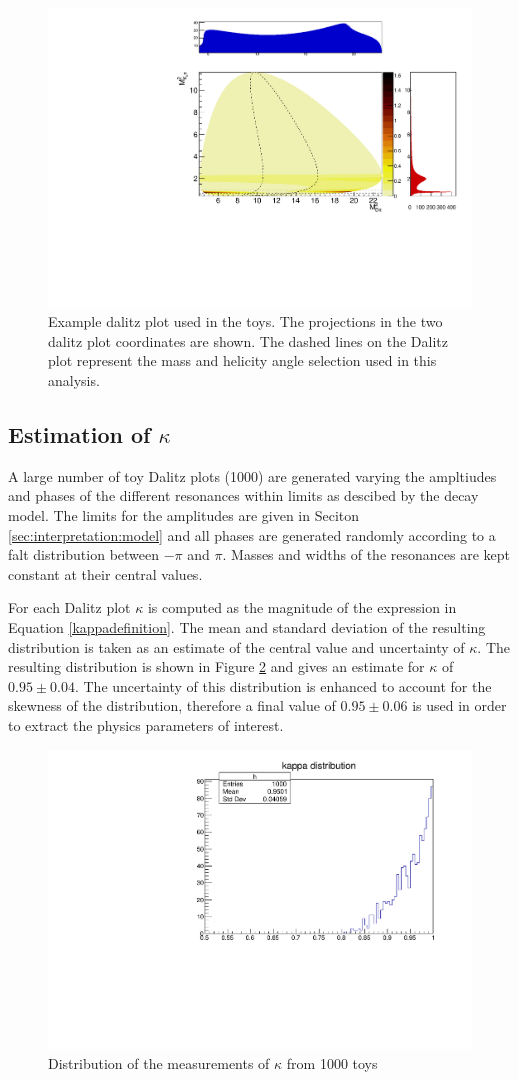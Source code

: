 \begin{figure}[h]
\centering
\includegraphics[width=0.8\linewidth]{figures/results/dalitz.pdf}
\caption{Example dalitz plot used in the toys. The projections in the two dalitz plot coordinates are shown. The dashed lines on the Dalitz plot represent the \Kstar mass and \KS helicity angle selection used in this analysis.}
\label{dalitzplot}
\end{figure}

\subsection{Estimation of $\kappa$}

A large number of toy Dalitz plots (1000) are generated varying the ampltiudes and phases of the different resonances within limits as descibed by the decay model. The limits for the amplitudes are given in Seciton \ref{sec:interpretation:model} and all phases are generated randomly according to a falt distribution between $-\pi$ and $\pi$. Masses and widths of the resonances are kept constant at their central values. 

For each Dalitz plot $\kappa$ is computed as the magnitude of the expression in Equation \ref{kappadefinition}. The mean and standard deviation of the resulting distribution is taken as an estimate of the central value and uncertainty of $\kappa$. The resulting distribution is shown in Figure \ref{kappadistribution} and gives an estimate for $\kappa$ of $0.95 \pm 0.04$. The uncertainty of this distribution is enhanced to account for the skewness of the distribution, therefore a final value of $0.95 \pm 0.06$ is used in order to extract the physics parameters of interest.

\begin{figure}[h]
\centering
\includegraphics[width=0.5\linewidth]{figures/results/kappa.pdf}
\caption{Distribution of the measurements of $\kappa$ from 1000 toys}
\label{kappadistribution}
\end{figure}

